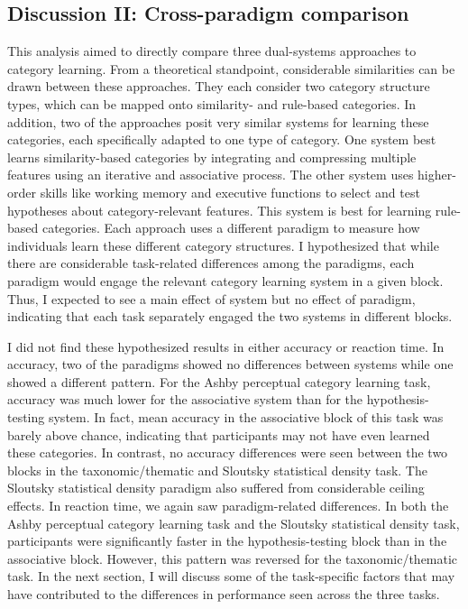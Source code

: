 \documentclass[../dissertation.tex]{subfiles}
\begin{document}
\subsection{Discussion II: Cross-paradigm comparison}

This analysis aimed to directly compare three dual-systems approaches to category learning. From a theoretical standpoint, considerable similarities can be drawn between these approaches. They each consider two category structure types, which can be mapped onto similarity- and rule-based categories. In addition, two of the approaches posit very similar systems for learning these categories, each specifically adapted to one type of category. One system best learns similarity-based categories by integrating and compressing multiple features using an iterative and associative process. The other system uses higher-order skills like working memory and executive functions to select and test hypotheses about category-relevant features. This system is best for learning rule-based categories. Each approach uses a different paradigm to measure how individuals learn these different category structures. I hypothesized that while there are considerable task-related differences among the paradigms, each paradigm would engage the relevant category learning system in a given block. Thus, I expected to see a main effect of system but no effect of paradigm, indicating that each task separately engaged the two systems in different blocks. \par
	I did not find these hypothesized results in either accuracy or reaction time. In accuracy, two of the paradigms showed no differences between systems while one showed a different pattern. For the Ashby perceptual category learning task, accuracy was much lower for the associative system than for the hypothesis-testing system. In fact, mean accuracy in the associative block of this task was barely above chance, indicating that participants may not have even learned these categories. In contrast, no accuracy differences were seen between the two blocks in the taxonomic/thematic and Sloutsky statistical density task. The Sloutsky statistical density paradigm also suffered from considerable ceiling effects. In reaction time, we again saw paradigm-related differences. In both the Ashby perceptual category learning task and the Sloutsky statistical density task, participants were significantly faster in the hypothesis-testing block than in the associative block. However, this pattern was reversed for the taxonomic/thematic task. In the next section, I will discuss some of the task-specific factors that may have contributed to the differences in performance seen across the three tasks. \par
	
\end{document}
